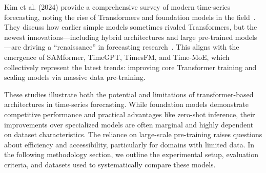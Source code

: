 Kim et al. (2024) provide a comprehensive survey of modern time-series forecasting, noting the rise of Transformers and foundation models in the field~\cite{kim2024survey}. They discuss how earlier simple models sometimes rivaled Transformers, but the newest innovations—including hybrid architectures and large pre-trained models—are driving a “renaissance” in forecasting research~\cite{kim2024survey}. This aligns with the emergence of SAMformer, TimeGPT, TimesFM, and Time-MoE, which collectively represent the latest trends: improving core Transformer training and scaling models via massive data pre-training.

These studies illustrate both the potential and limitations of transformer-based architectures in time-series forecasting. While foundation models demonstrate competitive performance and practical advantages like zero-shot inference, their improvements over specialized models are often marginal and highly dependent on dataset characteristics. The reliance on large-scale pre-training raises questions about efficiency and accessibility, particularly for domains with limited data. In the following methodology section, we outline the experimental setup, evaluation criteria, and datasets used to systematically compare these models.